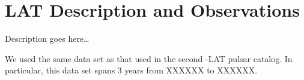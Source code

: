 \section{LAT Description and Observations}

Description goes here\ldots


We used the same data set as that used in the second \fermi-LAT 
pulsar catalog. In particular, this data set spans 3 years
from XXXXXX to XXXXXX.
